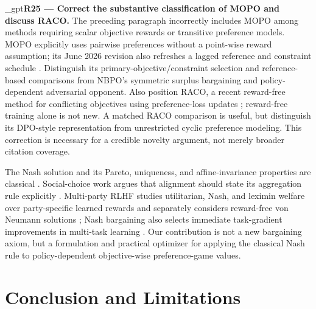 \documentclass{article}
\newif\ifshowreviews
\newcommand{\reviewresponse}[1]{%
  \ifshowreviews
  \par\begingroup\color{blue!65!black}\hypersetup{allcolors=blue!65!black}\emergencystretch=2em%
  \noindent\textbf{Response:} #1\par\endgroup
  \fi}
\theoremstyle{remark}
\theoremstyle{plain}
\begin{document}
\kekim_gpt{\textbf{R25 --- Correct the substantive classification of MOPO and discuss RACO.} The preceding paragraph incorrectly includes MOPO among methods requiring scalar objective rewards or transitive preference models. MOPO explicitly uses pairwise preferences without a point-wise reward assumption; its June 2026 revision also refreshes a lagged reference and constraint schedule \citep{agnihotri2026mopo}. Distinguish its primary-objective/constraint selection and reference-based comparisons from NBPO's symmetric surplus bargaining and policy-dependent adversarial opponent. Also position RACO, a recent reward-free method for conflicting objectives using preference-loss updates \citep{chen2026raco}; reward-free training alone is not new. A matched RACO comparison is useful, but distinguish its DPO-style representation from unrestricted cyclic preference modeling. This correction is necessary for a credible novelty argument, not merely broader citation coverage.}
\reviewresponse{\textbf{R25 --- Addressed in positioning; empirical comparison remains limited.} MOPO is correctly described as pairwise and reward-free, with a primary objective and constraints; RACO's preference-loss gradients are included. The measured MOPO row drops the original robustification and is explicitly a plug-in adaptation, not a faithful reproduction. A matched RACO experiment is not reported.}

The Nash solution and its Pareto, uniqueness, and affine-invariance properties are classical \citep{nash1950}. Social-choice work argues that alignment should state its aggregation rule explicitly \citep{conitzer2024social}. Multi-party RLHF studies utilitarian, Nash, and leximin welfare over party-specific learned rewards and separately considers reward-free von Neumann solutions \citep{zhong2024nashwelfare}; Nash bargaining also selects immediate task-gradient improvements in multi-task learning \citep{navon2022nashmtl}. Our contribution is not a new bargaining axiom, but a formulation and practical optimizer for applying the classical Nash rule to policy-dependent objective-wise preference-game values.

\section{Conclusion and Limitations}
\label{sec:conclusion}
\end{document}
